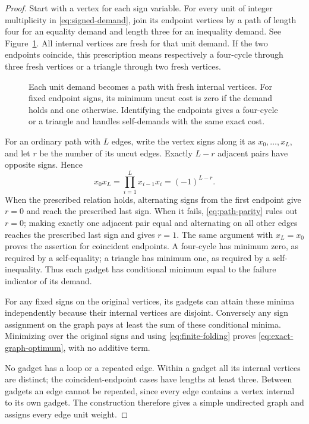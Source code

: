 \begin{proof}
Start with a vertex for each sign variable. For every unit of integer
multiplicity in \eqref{eq:signed-demand}, join its endpoint vertices
by a path of length four for an equality demand and length three for an
inequality demand. See Figure~\ref{fig:paths}. All internal vertices are fresh for that unit demand.
If the two endpoints coincide, this prescription means respectively
a four-cycle through three fresh vertices or a triangle through two
fresh vertices.

\begin{figure}[htbp]
\centering

\caption{Each unit demand becomes a path with fresh internal vertices.
For fixed endpoint signs, its minimum uncut cost is zero if the demand
holds and one otherwise. Identifying the endpoints gives a four-cycle
or a triangle and handles self-demands with the same exact cost.}
\label{fig:paths}
\end{figure}


For an ordinary path with $L$ edges, write the vertex signs along it as
$x_0,\ldots,x_L$, and let $r$ be the number of its uncut edges.
Exactly $L-r$ adjacent pairs have opposite signs. Hence
\begin{equation}\label{eq:path-parity}
 x_0x_L=\prod_{i=1}^L x_{i-1}x_i=(-1)^{L-r}.
\end{equation}
When the prescribed relation holds, alternating signs from the first
endpoint give $r=0$ and reach the prescribed last sign. When it fails,
\eqref{eq:path-parity} rules out $r=0$; making exactly one adjacent
pair equal and alternating on all other edges reaches the prescribed
last sign and gives $r=1$. The same argument with $x_L=x_0$ proves
the assertion for coincident endpoints. A four-cycle has minimum zero,
as required by a self-equality; a triangle has minimum one, as required
by a self-inequality. Thus each gadget has conditional minimum equal
to the failure indicator of its demand.

For any fixed signs on the original vertices, its gadgets can attain
these minima independently because their internal vertices are disjoint.
Conversely any sign assignment on the graph pays at least the sum of
these conditional minima. Minimizing over the original signs and using
\eqref{eq:finite-folding} proves \eqref{eq:exact-graph-optimum}, with
no additive term.

No gadget has a loop or a repeated edge. Within a gadget all its internal
vertices are distinct; the coincident-endpoint cases have lengths at
least three. Between gadgets an edge cannot be repeated, since every
edge contains a vertex internal to its own gadget. The construction
therefore gives a simple undirected graph and assigns every edge unit
weight.


\end{proof}
